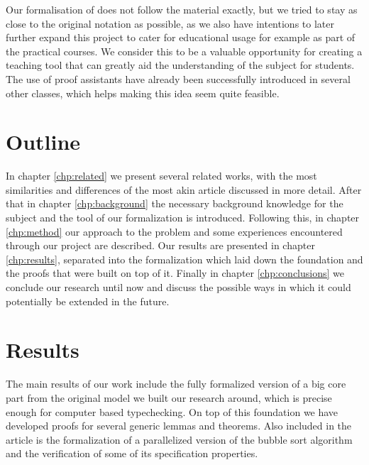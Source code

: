 Our formalisation of does not follow the material exactly, but we tried to stay as close to the original notation as possible, as we also have intentions to later further expand this project to cater for educational usage for example as part of the practical courses. We consider this to be a valuable opportunity for creating a teaching tool that can greatly aid the understanding of the subject for students. The use of proof assistants have already been successfully introduced in several other classes\cite{formalsemantics-typesystems}, which helps making this idea seem quite feasible.

\section{Outline}

In chapter \ref{chp:related} we present several related works, with the most similarities and differences of the most akin article discussed in more detail. After that in chapter \ref{chp:background} the necessary background knowledge for the subject and the tool of our formalization is introduced. Following this, in chapter \ref{chp:method} our approach to the problem and some experiences encountered through our project are described. Our results are presented in chapter \ref{chp:results}, separated into the formalization which laid down the foundation and the proofs that were built on top of it. Finally in chapter \ref{chp:conclusions} we conclude our research until now and discuss the possible ways in which it could potentially be extended in the future.

\section{Results}

The main results of our work include the fully formalized version of a big core part from the original model we built our research around, which is precise enough for computer based typechecking. On top of this foundation we have developed proofs for several generic lemmas and theorems. Also included in the article is the formalization of a parallelized version of the bubble sort algorithm and the verification of some of its specification properties.